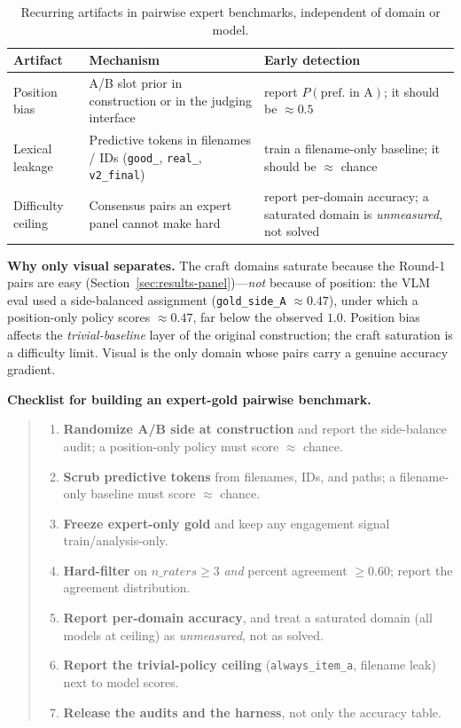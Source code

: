\documentclass[11pt,a4paper]{article}
\begin{document}
\begin{table}[t]
\centering
\small
\begin{tabular}{@{}lp{4.4cm}p{4.2cm}@{}}
\toprule
Artifact & Mechanism & Early detection \\
\midrule
Position bias & A/B slot prior in construction or in the judging interface & report $P(\text{pref.\ in A})$; it should be $\approx 0.5$ \\
Lexical leakage & Predictive tokens in filenames / IDs (\texttt{good\_}, \texttt{real\_}, \texttt{v2\_final}) & train a filename-only baseline; it should be $\approx$ chance \\
Difficulty ceiling & Consensus pairs an expert panel cannot make hard & report per-domain accuracy; a saturated domain is \emph{unmeasured}, not solved \\
\bottomrule
\end{tabular}
\caption{Recurring artifacts in pairwise expert benchmarks, independent of domain or model.}
\label{tab:recurring}
\end{table}

\textbf{Why only visual separates.} The craft domains saturate because the Round-1 pairs are easy (Section~\ref{sec:results-panel})---\emph{not} because of position: the VLM eval used a side-balanced assignment (\texttt{gold\_side\_A} $\approx 0.47$), under which a position-only policy scores $\approx 0.47$, far below the observed $1.0$. Position bias affects the \emph{trivial-baseline} layer of the original construction; the craft saturation is a difficulty limit. Visual is the only domain whose pairs carry a genuine accuracy gradient.

\textbf{Checklist for building an expert-gold pairwise benchmark.}
\begin{quote}
\begin{enumerate}[leftmargin=*,itemsep=2pt]
  \item \textbf{Randomize A/B side at construction} and report the side-balance audit; a position-only policy must score $\approx$ chance.
  \item \textbf{Scrub predictive tokens} from filenames, IDs, and paths; a filename-only baseline must score $\approx$ chance.
  \item \textbf{Freeze expert-only gold} and keep any engagement signal train/analysis-only.
  \item \textbf{Hard-filter} on $n\_raters \ge 3$ \emph{and} percent agreement $\ge 0.60$; report the agreement distribution.
  \item \textbf{Report per-domain accuracy}, and treat a saturated domain (all models at ceiling) as \emph{unmeasured}, not as solved.
  \item \textbf{Report the trivial-policy ceiling} (\texttt{always\_item\_a}, filename leak) next to model scores.
  \item \textbf{Release the audits and the harness}, not only the accuracy table.
\end{enumerate}
\end{quote}
\end{document}
